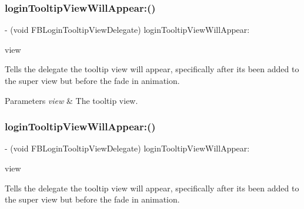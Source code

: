 \subsubsection{\texorpdfstring{login\+Tooltip\+View\+Will\+Appear\+:()}{loginTooltipViewWillAppear:()}\hspace{0.1cm}{\footnotesize\ttfamily [3/5]}}
{\footnotesize\ttfamily -\/ (void F\+B\+Login\+Tooltip\+View\+Delegate) login\+Tooltip\+View\+Will\+Appear\+: \begin{DoxyParamCaption}\item[{(\hyperlink{interfaceFBLoginTooltipView}{F\+B\+Login\+Tooltip\+View} $\ast$)}]{view }\end{DoxyParamCaption}\hspace{0.3cm}{\ttfamily [optional]}}

Tells the delegate the tooltip view will appear, specifically after it\textquotesingle{}s been added to the super view but before the fade in animation.


\begin{DoxyParams}{Parameters}
{\em view} & The tooltip view. \\
\hline
\end{DoxyParams}
\mbox{\label{protocolFBLoginTooltipViewDelegate_01-p_a0d89efb9ebc19a9b47dd4116d5130631}} 
\subsubsection{\texorpdfstring{login\+Tooltip\+View\+Will\+Appear\+:()}{loginTooltipViewWillAppear:()}\hspace{0.1cm}{\footnotesize\ttfamily [4/5]}}
{\footnotesize\ttfamily -\/ (void F\+B\+Login\+Tooltip\+View\+Delegate) login\+Tooltip\+View\+Will\+Appear\+: \begin{DoxyParamCaption}\item[{(\hyperlink{interfaceFBLoginTooltipView}{F\+B\+Login\+Tooltip\+View} $\ast$)}]{view }\end{DoxyParamCaption}\hspace{0.3cm}{\ttfamily [optional]}}

Tells the delegate the tooltip view will appear, specifically after it\textquotesingle{}s been added to the super view but before the fade in animation.


